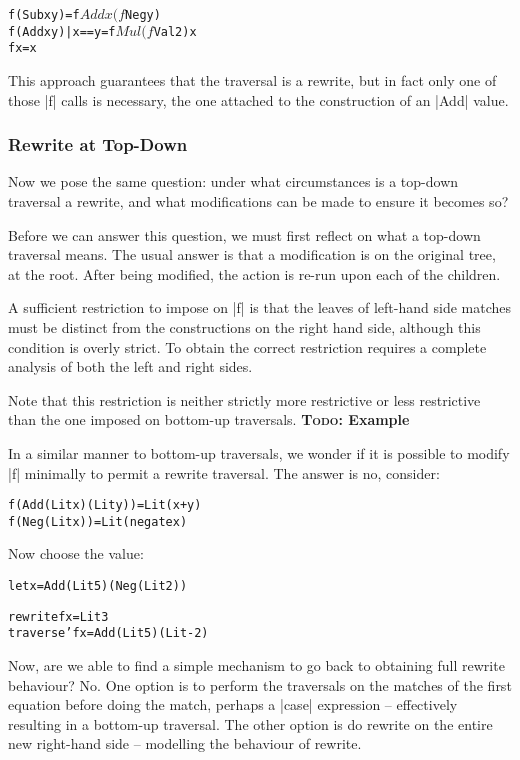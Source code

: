 \documentclass[preprint]{sigplanconf}
\newcommand{\todo}[1]{\textbf{\textsc{Todo:} #1}}
\newenvironment{code}{\begin{alltt}\small}{\end{alltt}}
\begin{document}
\begin{code}
f (Sub x y)           = f $ Add x (f $ Neg y)
f (Add x y) | x == y  = f $ Mul (f $ Val 2) x
f x                   = x
\end{code}

This approach guarantees that the traversal is a rewrite, but in fact only one of those |f| calls is necessary, the one attached to the construction of an |Add| value.


\subsubsection{Rewrite at Top-Down}

Now we pose the same question: under what circumstances is a top-down traversal a rewrite, and what modifications can be made to ensure it becomes so?

Before we can answer this question, we must first reflect on what a top-down traversal means. The usual answer is that a modification is on the original tree, at the root. After being modified, the action is re-run upon each of the children.

A sufficient restriction to impose on |f| is that the leaves of left-hand side matches must be distinct from the constructions on the right hand side, although this condition is overly strict. To obtain the correct restriction requires a complete analysis of both the left and right sides.

Note that this restriction is neither strictly more restrictive or less restrictive than the one imposed on bottom-up traversals. \todo{Example}

In a similar manner to bottom-up traversals, we wonder if it is possible to modify |f| minimally to permit a rewrite traversal. The answer is no, consider:

\begin{code}
f (Add (Lit x) (Lit y)  ) = Lit (x+y)
f (Neg (Lit x)          ) = Lit (negate x)
\end{code}

Now choose the value:

\begin{code}
let x = Add (Lit 5) (Neg (Lit 2))

rewrite f x = Lit 3
traverse' f x = Add (Lit 5) (Lit -2)
\end{code}

Now, are we able to find a simple mechanism to go back to obtaining full rewrite behaviour? No. One option is to perform the traversals on the matches of the first equation before doing the match, perhaps a |case| expression -- effectively resulting in a bottom-up traversal. The other option is do rewrite on the entire new right-hand side -- modelling the behaviour of rewrite.
\end{document}
